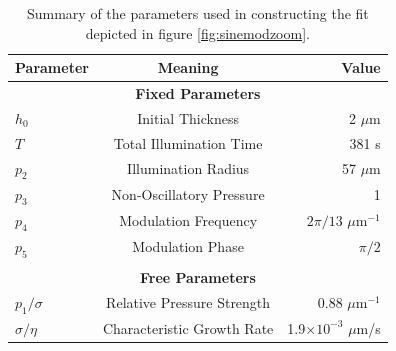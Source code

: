 \documentclass[twocolumn,showpacs,preprintnumbers,amsmath,amssymb]{revtex4}
\begin{document}
\begin{table}
  \begin{ruledtabular}
                                \begin{tabular}{l c r}
                                  \textbf{Parameter}&\textbf{Meaning}&\textbf{Value}\\
                                  \hline
                                  \multicolumn{3}{c}{\textbf{Fixed Parameters}}\\
                                  $h_0$& Initial Thickness&2 $\mu$m\\
                                  $T$& Total Illumination Time&381 s\\
                                  $p_2$&Illumination Radius&57 $\mu$m\\
                                  $p_3$&Non-Oscillatory Pressure&1\\
                                  $p_4$&Modulation Frequency&$2\pi/13$ $\mu$m$^{-1}$\\
                                  $p_5$&Modulation Phase&$\pi/2$\\
                                  \\
                                  \multicolumn{3}{c}{\textbf{Free Parameters}}\\
                                  $p_1/\sigma$&Relative Pressure Strength&0.88 $\mu$m$^{-1}$\\
                                  $\sigma/\eta$&Characteristic Growth Rate&1.9$\times 10^{-3}$ $\mu$m/s\\
                                \end{tabular}
  \end{ruledtabular}
  \caption{Summary of the parameters used in constructing the fit depicted in figure
                                \ref{fig:sinemodzoom}.} \label{tab:sinemod}
\end{table}


\end{document}
